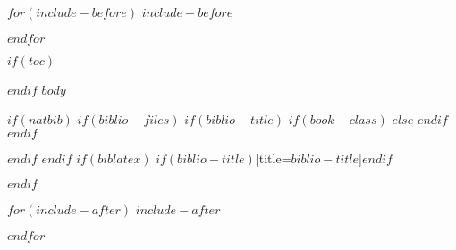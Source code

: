 \documentclass[$if(fontsize)$$fontsize$pt$endif$]{beamer}
\begin{document}
$for(include-before)$
$include-before$

$endfor$

\begin{frame}[t,plain]
\titlepage
\setcounter{framenumber}{0}
\end{frame}


$if(toc)$
\begin{frame}
\tableofcontents[hideallsubsections]
\end{frame}

$endif$
\setlength\itemsep{2em}
$body$

$if(natbib)$
$if(biblio-files)$
$if(biblio-title)$
$if(book-class)$
\renewcommand\bibname{$biblio-title$}
$else$
\renewcommand\refname{$biblio-title$}
$endif$
$endif$


$endif$
$endif$
$if(biblatex)$
\printbibliography$if(biblio-title)$[title=$biblio-title$]$endif$

$endif$

$for(include-after)$
$include-after$

$endfor$
\end{document}
